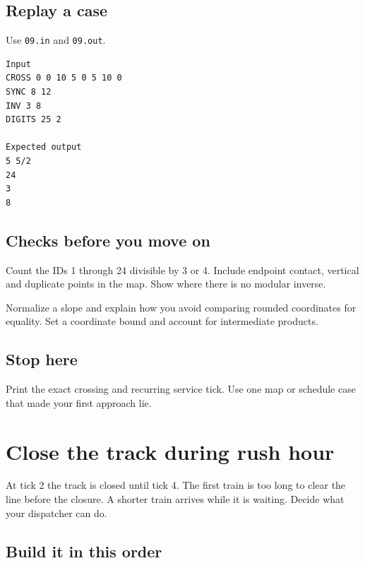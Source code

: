 \documentclass[11pt,letterpaper]{article}
\begin{document}
\subsection*{Replay a case}

Use \texttt{09.in} and \texttt{09.out}.

\begin{samepage}
\small
\begin{verbatim}
Input
CROSS 0 0 10 5 0 5 10 0
SYNC 8 12
INV 3 8
DIGITS 25 2

Expected output
5 5/2
24
3
8
\end{verbatim}
\end{samepage}

\subsection*{Checks before you move on}

Count the IDs 1 through 24 divisible by 3 or 4. Include endpoint contact, vertical and duplicate points in the map. Show where there is no modular inverse.

Normalize a slope and explain how you avoid comparing rounded coordinates for equality. Set a coordinate bound and account for intermediate products.

\subsection*{Stop here}

Print the exact crossing and recurring service tick. Use one map or schedule case that made your first approach lie.

\clearpage

\section{Close the track during rush hour}\label{trains:10}

At tick 2 the track is closed until tick 4. The first train is too long to clear the line before the closure. A shorter train arrives while it is waiting. Decide what your dispatcher can do.

\subsection*{Build it in this order}
\end{document}
